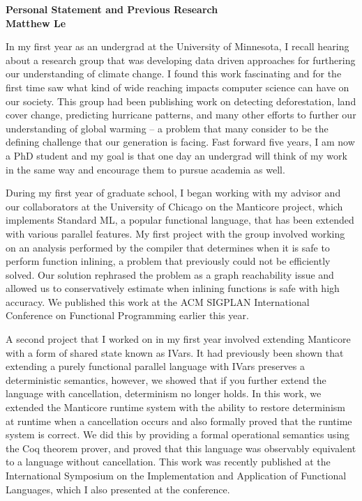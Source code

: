 \documentclass[12pt]{article}
\begin{document}
\begin{center}
{\bf Personal Statement and Previous Research} \\
{\bf Matthew Le} \\
\end{center}

In my first year as an undergrad at the University of Minnesota, I recall hearing about a research group that was developing data driven approaches for furthering our understanding of climate change. I found this work fascinating and for the first time saw what kind of wide reaching impacts computer science can have on our society. This group had been publishing work on detecting deforestation, land cover change, predicting hurricane patterns, and many other efforts to further our understanding of global warming -- a problem that many consider to be the defining challenge that our generation is facing. Fast forward five years, I am now a PhD student and my goal is that one day an undergrad will think of my work in the same way and encourage them to pursue academia as well.

During my first year of graduate school, I began working with my advisor and our collaborators at the University of Chicago on the Manticore project, which implements Standard ML, a popular functional language, that has been extended with various parallel features.  My first project with the group involved working on an analysis performed by the compiler that determines when it is safe to perform function inlining, a problem that previously could not be efficiently solved.  Our solution rephrased the problem as a graph reachability issue and allowed us to conservatively estimate when inlining functions is safe with high accuracy.  We published this work at the ACM SIGPLAN International Conference on Functional Programming earlier this year.  

A second project that I worked on in my first year involved extending Manticore with a form of shared state known as IVars.  It had previously been shown that extending a purely functional parallel language with IVars preserves a deterministic semantics, however, we showed that if you further extend the language with cancellation, determinism no longer holds.  In this work, we extended the Manticore runtime system with the ability to restore determinism at runtime when a cancellation occurs and also formally proved that the runtime system is correct.  We did this by providing a formal operational semantics using the Coq theorem prover, and proved that this language was observably equivalent to a language without cancellation.  This work was recently published at the International Symposium on the Implementation and Application of Functional Languages, which I also presented at the conference.  
\end{document}

